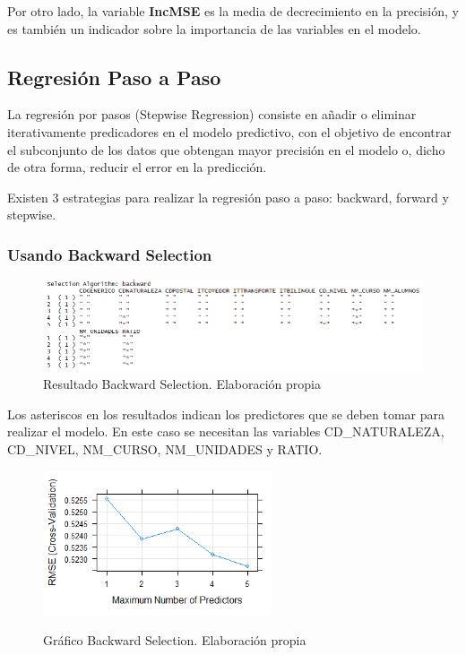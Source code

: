 \begin{subappendices}
Por otro lado, la variable \textbf{IncMSE} es la media de decrecimiento en la precisión, y es también un indicador sobre la importancia de las variables en el modelo.
\subsection{Regresión Paso a Paso}
\label{appendix:A.C.2}
La regresión por pasos (Stepwise Regression) consiste en añadir o eliminar iterativamente predicadores en el modelo predictivo, con el objetivo de encontrar el subconjunto de los datos que obtengan mayor precisión en el modelo o, dicho de otra forma, reducir el error en la predicción. \cite{kassambara2018}

Existen 3 estrategias para realizar la regresión paso a paso: backward, forward y stepwise.

\subsubsection{Usando Backward Selection}
\begin{figure}[htb]
	\centering
	\caption{Resultado Backward Selection. Elaboración propia}
	\label{fig:backwardSum}
	\includegraphics[width=1\textwidth]{recursos/ImagenesR/backwardSum}
	
\end{figure}
\FloatBarrier

Los asteriscos en los resultados indican los predictores que se deben tomar para realizar el modelo. En este caso se necesitan las variables CD\_NATURALEZA, CD\_NIVEL, NM\_CURSO, NM\_UNIDADES y RATIO.

\begin{figure}[htb]
	\centering
	\caption{Gráfico Backward Selection. Elaboración propia}
	\includegraphics[width=0.6\textwidth]{recursos/ImagenesR/backward}
	\label{fig:backward}
\end{figure}
\FloatBarrier


\end{subappendices}
